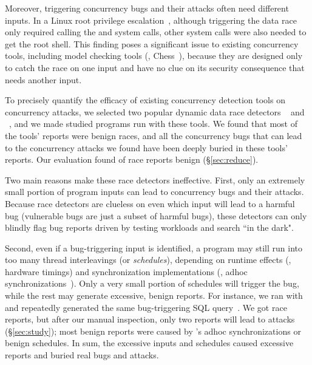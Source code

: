 Moreover, triggering concurrency bugs and their attacks often need different 
inputs. In a Linux root privilege escalation~\cite{uselib-bug-12791}, although 
triggering the data race only required calling the \uselib and \mmap system 
calls, other system calls were also needed to get the root shell. This finding 
poses a significant issue to existing concurrency tools, including model 
checking tools (\eg, Chess~\cite{musuvathi:chess:osdi08}), because they are 
designed only to catch the race on one input and have no clue on its security 
consequence that needs another input.

To precisely quantify the efficacy of existing concurrency detection tools on 
concurrency attacks, we selected two popular dynamic data 
race detectors \tsan~\cite{tsan:wbia09} and \ski~\cite{ski:osdi14}, 
and we made \nreproducedProgs studied programs run with these tools. We found 
that most of the tools' reports were benign races, and all the concurrency 
bugs that can lead to the \nreproduced concurrency attacks we found have been 
deeply buried in these tools' reports. Our evaluation found 
\reducerate of race reports benign (\S\ref{sec:reduce}).




Two main reasons make these race detectors ineffective. First, only an 
extremely small portion of program inputs can lead to concurrency bugs and 
their 
attacks. Because race detectors are clueless on even which input will lead to 
a harmful bug (vulnerable bugs are just a subset of harmful bugs), these 
detectors can only blindly flag bug reports driven by 
testing workloads and search ``in the dark". 

Second, even if a bug-triggering input is identified, a program may still run 
into too many thread interleavings (or \emph{schedules}), depending on 
runtime effects (\eg, hardware timings) and synchronization implementations 
(\eg, adhoc synchronizations~\cite{syncfinder:osdi10}). Only a very small portion of 
schedules will trigger the bug, while the rest may generate excessive, benign 
reports. For instance, we ran \mysql with \tsan and repeatedly generated the 
same bug-triggering SQL query~\cite{mysql-bug-24988}. We got 
\nmysqlDetectedSameReq race reports, but after our manual inspection, only two 
reports will lead to attacks (\S\ref{sec:study}); most benign reports were 
caused by \mysql's adhoc synchronizations or benign schedules. In sum, the 
excessive inputs and schedules caused excessive reports and buried real bugs and 
attacks.


